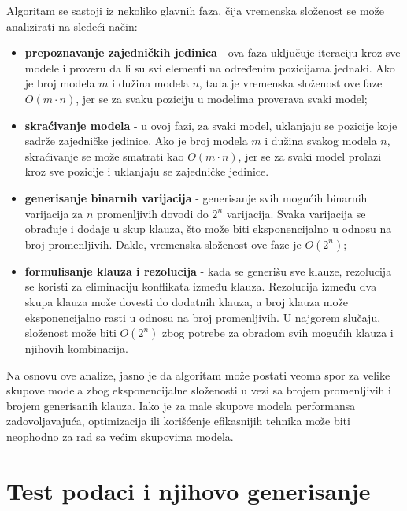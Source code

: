 \documentclass[12pt,oneside]{memoir}
\begin{document}
Algoritam se sastoji iz nekoliko glavnih faza, čija vremenska složenost se može analizirati na sledeći način:

\begin{itemize}
    \item \textbf{prepoznavanje zajedničkih jedinica} - ova faza uključuje iteraciju kroz sve modele i proveru da li su svi elementi na određenim pozicijama jednaki. Ako je broj modela \( m \) i dužina modela \( n \), tada je vremenska složenost ove faze \( O(m \cdot n) \), jer se za svaku poziciju u modelima proverava svaki model;
    
    \item \textbf{skraćivanje modela} - u ovoj fazi, za svaki model, uklanjaju se pozicije koje sadrže zajedničke jedinice. Ako je broj modela \( m \) i dužina svakog modela \( n \), skraćivanje se može smatrati kao \( O(m \cdot n) \), jer se za svaki model prolazi kroz sve pozicije i uklanjaju se zajedničke jedinice.
    
    \item \textbf{generisanje binarnih varijacija} - generisanje svih mogućih binarnih varijacija za \( n \) promenljivih dovodi do \( 2^n \) varijacija. Svaka varijacija se obrađuje i dodaje u skup klauza, što može biti eksponencijalno u odnosu na broj promenljivih. Dakle, vremenska složenost ove faze je \( O(2^n) \);
    
    \item \textbf{formulisanje klauza i rezolucija} - kada se generišu sve klauze, rezolucija se koristi za eliminaciju konflikata između klauza. Rezolucija između dva skupa klauza može dovesti do dodatnih klauza, a broj klauza može eksponencijalno rasti u odnosu na broj promenljivih. U najgorem slučaju, složenost može biti \( O(2^n) \) zbog potrebe za obradom svih mogućih klauza i njihovih kombinacija.
\end{itemize}

Na osnovu ove analize, jasno je da algoritam može postati veoma spor za velike skupove modela zbog eksponencijalne složenosti u vezi sa brojem promenljivih i brojem generisanih klauza. Iako je za male skupove modela performansa zadovoljavajuća, optimizacija ili korišćenje efikasnijih tehnika može biti neophodno za rad sa većim skupovima modela.

\section{Test podaci i njihovo generisanje}
\end{document}
